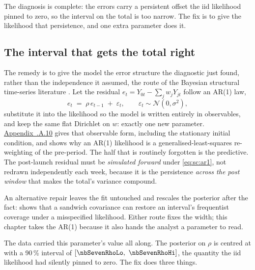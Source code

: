 The diagnosis is complete: the errors carry a persistent offset the iid likelihood pinned to zero,
so the interval on the total is too narrow. The fix is to give the likelihood that persistence, and
one extra parameter does it.

\subsection*{The interval that gets the total right}

The remedy is to give the model the error structure the diagnostic just found, rather than the
independence it assumed, the route of the Bayesian structural time-series literature
\citep{brodersen2015}. Let the residual $e_t = Y_{0t} - \sum_j w_j Y_{jt}$ follow an AR(1) law,
%
\begin{equation}
  e_t \;=\; \rho\, e_{t-1} \;+\; \varepsilon_t,
        \qquad \varepsilon_t \sim \mathcal N(0, \sigma^{2}), \label{eq:sc:ar1}
\end{equation}
%
substitute it into the likelihood so the model is written entirely in observables, and keep the
same flat Dirichlet on $w$: exactly one new parameter.
\hyperref[app:sc:ar1]{Appendix~\thechapter.A.10} gives that observable form, including the stationary
initial condition, and shows why an AR(1) likelihood is a generalised-least-squares re-weighting of
the pre-period. The half that is routinely forgotten is the predictive. The post-launch residual
must be \emph{simulated forward} under \cref{eq:sc:ar1}, not redrawn independently each week,
because it is the persistence \emph{across the post window} that makes the total's variance
compound.

An alternative repair leaves the fit untouched and rescales the posterior after the fact:
\citet{mueller2013} shows that a sandwich covariance can restore an interval's frequentist coverage
under a misspecified likelihood. Either route fixes the width; this chapter takes the AR(1) because
it also hands the analyst a parameter to read.

The data carried this parameter's value all along. The posterior on $\rho$ is centred at
\nbSevenRhoPost{} with a 90\,\% interval of $[\nbSevenRhoLo,\ \nbSevenRhoHi]$, the quantity the
iid likelihood had silently pinned to zero. The fix does three things.

